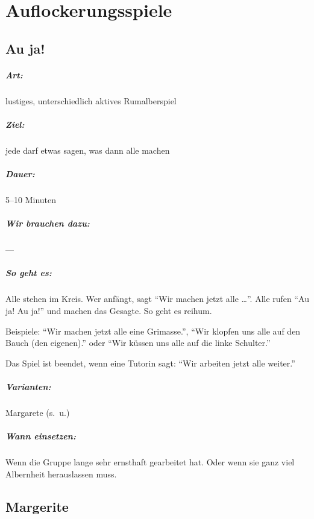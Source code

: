 \chapter{Auflockerungsspiele}

\section{Au ja!}
\paragraph{Art:} lustiges, unterschiedlich aktives Rumalberspiel
\paragraph{Ziel:} jede darf etwas sagen, was dann alle machen
\paragraph{Dauer:} 5--10 Minuten
\paragraph{Wir brauchen dazu:} ---
\paragraph{So geht es:} Alle stehen im Kreis. Wer anfängt, sagt "`Wir machen jetzt alle \ldots"'. Alle rufen "`Au ja! Au ja!"' und machen das Gesagte. So geht es reihum.

Beispiele: "`Wir machen jetzt alle eine Grimasse."', "`Wir klopfen uns alle auf den Bauch (den eigenen)."' oder "`Wir küssen uns alle auf die linke Schulter."'

Das Spiel ist beendet, wenn eine Tutorin sagt: "`Wir arbeiten jetzt alle weiter."'
\paragraph{Varianten:} Margarete (s.~u.)
\paragraph{Wann einsetzen:} Wenn die Gruppe lange sehr ernsthaft gearbeitet hat. Oder wenn sie ganz viel Albernheit herauslassen muss.

\section{Margerite}
